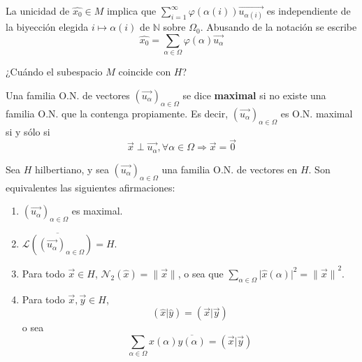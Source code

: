 \documentclass[12pt]{report}
\theoremstyle{largebreak}
\newcommand\abs[1]{\ensuremath{\big|#1\big|}}
\newcommand\norm[1]{\ensuremath{\|#1\|}}
\newcommand\pint[2]{\ensuremath{\left(#1\big| #2\right)}}
\newcommand\conj[1]{\ensuremath{\overline{#1}}}
\newcommand{\N}[2]{\ensuremath{\mathcal{N}_{#1}\left(#2\right)}}
\begin{document}
    \begin{obs}
        La unicidad de $\hat{x_0}\in M$ implica que $\sum_{i=1}^{\infty}\varphi(\alpha(i))\vec{u_{\alpha(i)}}$ es independiente de la biyección elegida $i\mapsto \alpha(i)$ de $\mathbb{N}$ sobre $\Omega_0$. Abusando de la notación se escribe
        \begin{equation*}
            \hat{x_0}=\sum_{\alpha\in\Omega}\varphi(\alpha)\vec{u_\alpha}
        \end{equation*}
    \end{obs}

    ¿Cuándo el subespacio $M$ coincide con $H$?

    \begin{mydef}
        Una familia O.N. de vectores $\left(\vec{u_\alpha} \right)_{\alpha\in\Omega}$ se dice \textbf{maximal} si no existe una familia O.N. que la contenga propiamente. Es decir, $\left(\vec{u_\alpha} \right)_{\alpha\in\Omega}$ es O.N. maximal si y sólo si
        \begin{equation*}
            \vec{x}\perp\vec{u_\alpha},\forall\alpha\in\Omega\Rightarrow\vec{x}=\vec{0}
        \end{equation*}
    \end{mydef}

    \begin{theor}
        Sea $H$ hilbertiano, y sea $\left(\vec{u_\alpha} \right)_{\alpha\in\Omega}$ una familia O.N. de vectores en $H$. Son equivalentes las siguientes afirmaciones:
        \begin{enumerate}
            \item $\left(\vec{u_\alpha} \right)_{\alpha\in\Omega}$ es maximal.
            \item $\overline{\mathcal{L}\left(\left(\vec{u_\alpha} \right)_{\alpha\in\Omega}\right)}=H$.
            \item Para todo $\vec{x}\in H$, $\N{2}{\hat{x}}=\norm{\vec{x}}$, o sea que $\sum_{\alpha\in\Omega}\abs{\hat{x}(\alpha)}^2=\norm{\vec{x}}^2$.
            \item Para todo $\vec{x},\vec{y}\in H$,
            \begin{equation*}
                \pint{\hat{x}}{\hat{y}}=\pint{\vec{x}}{\vec{y}}
            \end{equation*}
            o sea
            \begin{equation*}
                \sum_{\alpha\in\Omega}x(\alpha)\conj{y(\alpha)}=\pint{\vec{x}}{\vec{y}}
            \end{equation*}
        \end{enumerate}

    \end{theor}
\end{document}

